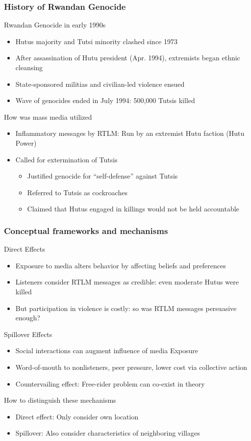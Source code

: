 \documentclass[aspectratio=169]{beamer}
\begin{document}
\begin{frame}
\frametitle{History of Rwandan Genocide} 
Rwandan Genocide in early 1990s
\begin{itemize}\setlength\itemsep{3pt}
\item Hutus majority and Tutsi minority clashed since 1973
\item After assassination of Hutu president (Apr. 1994), extremists began ethnic cleansing
\item State-sponsored militias and civilian-led violence ensued
\item Wave of genocides ended in July 1994: 500,000 Tutsis killed
\end{itemize}\medskip
How was mass media utilized
\begin{itemize} \setlength\itemsep{3pt}
\item Inflammatory messages by RTLM: Run by an extremist Hutu faction (Hutu Power)
\item Called for extermination of Tutsis
\begin{itemize} \setlength\itemsep{3pt}
\item Justified genocide for ``self-defense'' against Tutsis
\item Referred to Tutsis as cockroaches
\item Claimed that Hutus engaged in killings would not be held accountable
\end{itemize}
\end{itemize}\medskip
\end{frame}

\begin{frame}
\frametitle{Conceptual frameworks and mechanisms} 
Direct Effects
\begin{itemize}\setlength\itemsep{3pt}
\item Exposure to media alters behavior by affecting beliefs and preferences
\item Listeners consider RTLM messages as credible: even moderate Hutus were killed
\item But participation in violence is costly: so was RTLM messages persuasive enough?
\end{itemize}\medskip
Spillover Effects
\begin{itemize}\setlength\itemsep{3pt}
\item Social interactions can augment influence of media Exposure
\item Word-of-mouth to nonlisteners, peer pressure, lower cost via collective action 
\item Countervailing effect: Free-rider problem can co-exist in theory
\end{itemize}\medskip
How to distinguish these mechanisms
\begin{itemize}\setlength\itemsep{3pt}
\item Direct effect: Only consider own location
\item Spillover: Also consider characteristics of neighboring villages

\end{itemize}
\end{frame}
\end{document}
